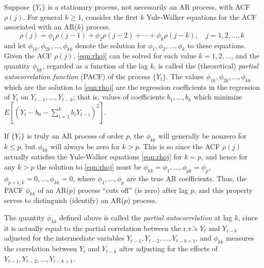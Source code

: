 Suppose $\{ Y_t \}$ is a stationary process, not necessarily an AR process, with ACF $\rho(j)$. For general $k \geq 1$, consider the first $k$ Yule-Walker equations for the ACF associated with an AR($k$) process.
	\begin{equation} \label{eqn:rhoj}
	\rho(j) = \phi_1 \rho(j-1) + \phi_2 \rho(j-2) + \cdots + \phi_k \rho(j-k), \quad j = 1, 2,\ldots, k
	\end{equation}
and let $\phi_{1k}, \phi_{2k}, \ldots, \phi_{kk}$ denote the solution for $\phi_1, \phi_2, \ldots, \phi_k$ to these equations. Given the ACF $\rho(j)$, \eqref{eqn:rhoj} can be solved for each value $k= 1,2, \ldots$, and the quantity $\phi_{kk}$, regarded as a function of the lag $k$, is called the (theoretical) \emph{partial autocorrelation function} (PACF) of the process $\{ Y_t \}$. The values $\phi_{1k},  \phi_{2k}, \ldots, \phi_{kk}$ which are the solution to \eqref{eqn:rhoj} are the regression coefficients in the regression of $Y_t$ on $Y_{t-1}, \ldots, Y_{t-k}$; that is, values of coefficients $b_1, \ldots, b_k$ which minimize $E[(Y_t - b_0 - \sum_{i=1}^k b_iY_{t-i})^2]$.


If $\{ Y_t \}$ is truly an AR process of order $p$, the $\phi_{kk}$ will generally be nonzero for $k \leq p$, but $\phi_{kk}$ will always be zero for $k > p$. This is so since the ACF $\rho(j)$ actually satisfies the Yule-Walker equations \eqref{eqn:rhoj} for $k= p$, and hence for any $k > p$ the solution to \eqref{eqn:rhoj} must be $\phi_{kk}= \phi_1, \ldots, \phi_{pk}= \phi_p$, $\phi_{p+1,k} = 0, \ldots,\phi_{kk} = 0$, where $\phi_1, \ldots, \phi_p$ are the true AR coefficients. Thus, the PACF $\phi_{kk}$ of an AR($p$) process ``cuts off'' (is zero) after lag $p$, and this property serves to distinguish (identify) an AR($p$) process.


The quantity $\phi_{kk}$ defined above is called the \emph{partial autocorrelation} at lag $k$, since it is actually equal to the partial correlation between the r.v.'s $Y_t$ and $Y_{t-k}$ adjusted for the intermediate variables $Y_{t-1}, Y_{t-2}, \ldots, Y_{t-k+1}$, and $\phi_{kk}$ measures the correlation between $Y_t$ and $Y_{t-k}$ after adjusting for the effects of $Y_{t-1}, Y_{t-2}, \ldots, Y_{t-k+1}$.


